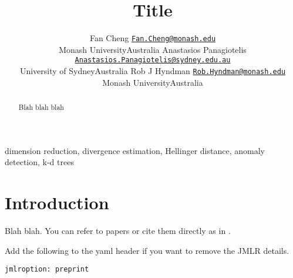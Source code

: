 \documentclass[11pt,twoside]{article}
\begin{document}
\def\proof{\par\noindent{\bf Proof\ }}
\def\endproof{\hfill\BlackBox\\[2mm]}

\title{Title}

\author{%
\name Fan Cheng \email \href{mailto:Fan.Cheng@monash.edu}{\nolinkurl{Fan.Cheng@monash.edu}} \\\addr Monash University\newline Australia \AND
%
\name Anastasios Panagiotelis \email \href{mailto:Anastasios.Panagiotelis@sydney.edu.au}{\nolinkurl{Anastasios.Panagiotelis@sydney.edu.au}} \\\addr University of Sydney\newline Australia \AND
%
\name Rob J Hyndman \email \href{mailto:Rob.Hyndman@monash.edu}{\nolinkurl{Rob.Hyndman@monash.edu}} \\\addr Monash University\newline Australia \AND
}

\editor{}

\maketitle



\begin{abstract}
Blah blah blah
\end{abstract}

\begin{keywords}
dimension reduction, divergence estimation, Hellinger distance, anomaly detection, k-d trees
\end{keywords}


\newpage

\hypertarget{introduction}{%
\section{Introduction}\label{introduction}}

Blah blah. You can refer to papers \citep{Witten2011} or cite them directly as in \citet{AriasCastro2020}.

Add the following to the yaml header if you want to remove the JMLR details.

\begin{verbatim}
jmlroption: preprint
\end{verbatim}




\vskip 0.2in

\end{document}
